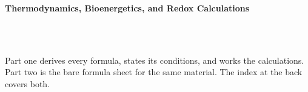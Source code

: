 



\makeindex[title={Index of This Volume},columns=2,intoc]

\begin{titlepage}\thispagestyle{empty}
\vspace*{0.14\textheight}
\noindent{\color{tiercore}\rule{\textwidth}{5pt}}\\[3pt]
\noindent{\color{bioline}\rule{\textwidth}{1pt}}\\[26pt]
\\[12pt]
\noindent\begin{minipage}{\textwidth}\raggedright
{\sffamily\bfseries\fontsize{28}{32}\selectfont\color{bioink}%
 \hyphenchar{} Thermodynamics, Bioenergetics, and Redox Calculations\par}\end{minipage}\\[16pt]
\noindent{\color{biogreen}\rule{\textwidth}{1.4pt}}\\[10pt]
\noindent\begin{minipage}{\textwidth}\raggedright
{\fontsize{10.5}{14}\selectfont\color{biogreen}%
Part one derives every formula, states its conditions, and works the calculations. Part two is the
bare formula sheet for the same material. The index at the back covers both.\par}\end{minipage}
\vfill
\noindent{\color{bioline}\rule{\textwidth}{1pt}}\\[3pt]
\noindent{\color{tiercore}\rule{\textwidth}{5pt}}
\end{titlepage}
\tableofcontents
\clearpage
{}
\clearpage
\printindex

